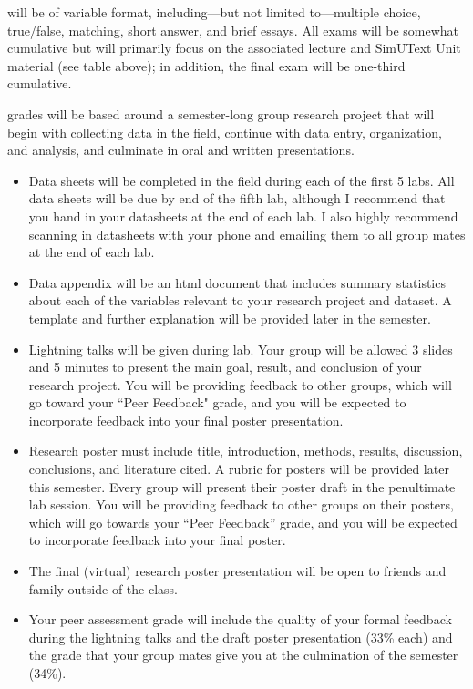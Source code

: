 \documentclass{tufte-handout}
\begin{document}
 will be of variable format, including---but not limited to---multiple choice, true/false, matching, short answer, and brief essays. All exams will be somewhat cumulative but will primarily focus on the associated lecture and SimUText Unit material (see table above); in addition, the final exam will be one-third cumulative. 

\begin{fullwidth}

 grades will be based around a semester-long group research project that will begin with collecting data in the field, continue with data entry, organization, and analysis, and culminate in oral and written presentations. 

\begin{itemize}
\item Data sheets will be completed in the field during each of the first 5 labs. All data sheets will be due by end of the fifth lab, although I recommend that you hand in your datasheets at the end of each lab. I also highly recommend scanning in datasheets with your phone and emailing them to all group mates at the end of each lab. 
\item Data appendix will be an html document that includes summary statistics about each of the variables relevant to your research project and dataset. A template and further explanation will be provided later in the semester. 
\item Lightning talks will be given during lab. Your group will be allowed 3 slides and 5 minutes to present the main goal, result, and conclusion of your research project. You will be providing feedback to other groups, which will go toward your ``Peer Feedback" grade, and you will be expected to incorporate feedback into your final poster presentation.
\item Research poster must include title, introduction, methods, results, discussion, conclusions, and literature cited. A rubric for posters will be provided later this semester. Every group will present their poster draft in the penultimate lab session. You will be providing feedback to other groups on their posters, which will go towards your ``Peer Feedback'' grade, and you will be expected to incorporate feedback into your final poster. 
\item The final (virtual) research poster presentation will be open to friends and family outside of the class.
\item Your peer assessment grade will include the quality of your formal feedback during the lightning talks and the draft poster presentation (33\% each) and the grade that your group mates give you at the culmination of the semester (34\%). 
\end{itemize}


\end{fullwidth}
\end{document}
